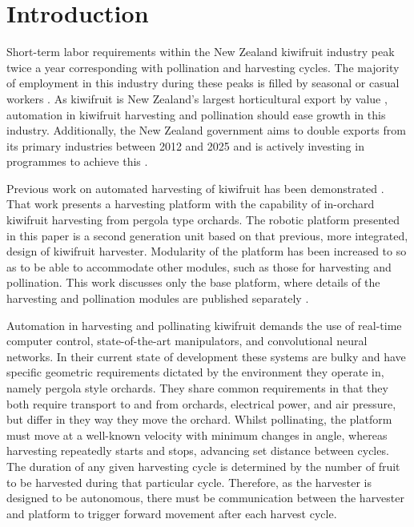 \documentclass[preprint,authoryear,12pt]{elsarticle}
\begin{document}

\section{Introduction}
\label{sect:intro}
    Short-term labor requirements within the New Zealand kiwifruit industry peak twice a year corresponding with pollination and harvesting cycles.
    The majority of employment in this industry during these peaks is filled by seasonal or casual workers \citep{Timmins2009}.
    As kiwifruit is New Zealand's largest horticultural export by value \citep{StatisticsNewZealand2015}, automation in kiwifruit harvesting and pollination should ease growth in this industry.
    Additionally, the New Zealand government aims to double exports from its primary industries between 2012 and 2025 and is actively investing in programmes to achieve this \citep{MinistryPrimaryIndustries2015}.

    Previous work on automated harvesting of kiwifruit has been demonstrated \citep{Scarfe2012,scarfe2009}.
    That work presents a harvesting platform with the capability of in-orchard kiwifruit harvesting from pergola type orchards.
    The robotic platform presented in this paper is a second generation unit based on that previous, more integrated, design of kiwifruit harvester.
    Modularity of the platform has been increased to so as to be able to accommodate other modules, such as those for harvesting and pollination.
    This work discusses only the base platform, where details of the harvesting and pollination modules are published separately \citep{williams2017,Seabright2017}.

    Automation in harvesting and pollinating kiwifruit demands the use of real-time computer control, state-of-the-art manipulators, and convolutional neural networks.
    In their current state of development these systems are bulky and have specific geometric requirements dictated by the environment they operate in, namely pergola style orchards.
    They share common requirements in that they both require transport to and from orchards, electrical power, and air pressure, but differ in they way they move the orchard.
    Whilst pollinating, the platform must move at a well-known velocity with minimum changes in angle, whereas harvesting repeatedly starts and stops, advancing set distance between cycles.
    The duration of any given harvesting cycle is determined by the number of fruit to be harvested during that particular cycle.
    Therefore, as the harvester is designed to be autonomous, there must be communication between the harvester and platform to trigger forward movement after each harvest cycle.
\end{document}
